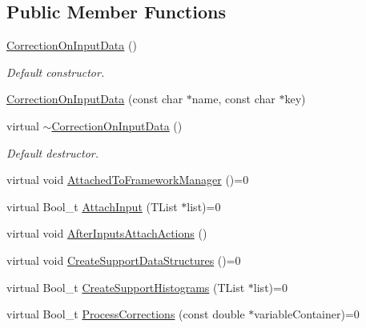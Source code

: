 \subsection*{Public Member Functions}
\begin{DoxyCompactItemize}
\item 
\mbox{\label{classQn_1_1CorrectionOnInputData_a15e8ed1c6af8a630b16f3816306b2f1d}} 
\mbox{\hyperlink{classQn_1_1CorrectionOnInputData_a15e8ed1c6af8a630b16f3816306b2f1d}{Correction\+On\+Input\+Data}} ()
\begin{DoxyCompactList}\small\item\em Default constructor. \end{DoxyCompactList}\item 
\mbox{\hyperlink{classQn_1_1CorrectionOnInputData_a519a4d9222892b586efa89bb47cd46e8}{Correction\+On\+Input\+Data}} (const char $\ast$name, const char $\ast$key)
\item 
\mbox{\label{classQn_1_1CorrectionOnInputData_a2cdd1d2536214897d3b61fc2463601c6}} 
virtual \mbox{\hyperlink{classQn_1_1CorrectionOnInputData_a2cdd1d2536214897d3b61fc2463601c6}{$\sim$\+Correction\+On\+Input\+Data}} ()
\begin{DoxyCompactList}\small\item\em Default destructor. \end{DoxyCompactList}\item 
virtual void \mbox{\hyperlink{classQn_1_1CorrectionOnInputData_adab1d79e0c216c6c981cd8d7ed271490}{Attached\+To\+Framework\+Manager}} ()=0
\item 
virtual Bool\+\_\+t \mbox{\hyperlink{classQn_1_1CorrectionOnInputData_a37c53966c0121ed0f7d764a9769690be}{Attach\+Input}} (T\+List $\ast$list)=0
\item 
virtual void \mbox{\hyperlink{classQn_1_1CorrectionOnInputData_ada5498cdbba9a7697a120f47fd64ae46}{After\+Inputs\+Attach\+Actions}} ()
\item 
virtual void \mbox{\hyperlink{classQn_1_1CorrectionOnInputData_a7da5cb5e6c82e28e2dd63d82ac82bc8a}{Create\+Support\+Data\+Structures}} ()=0
\item 
virtual Bool\+\_\+t \mbox{\hyperlink{classQn_1_1CorrectionOnInputData_a1556dd574545ef77d6b462020101bf39}{Create\+Support\+Histograms}} (T\+List $\ast$list)=0
\item 
virtual Bool\+\_\+t \mbox{\hyperlink{classQn_1_1CorrectionOnInputData_a42390a6c47f558faeb1e14d245dcbc4a}{Process\+Corrections}} (const double $\ast$variable\+Container)=0

\end{DoxyCompactItemize}
